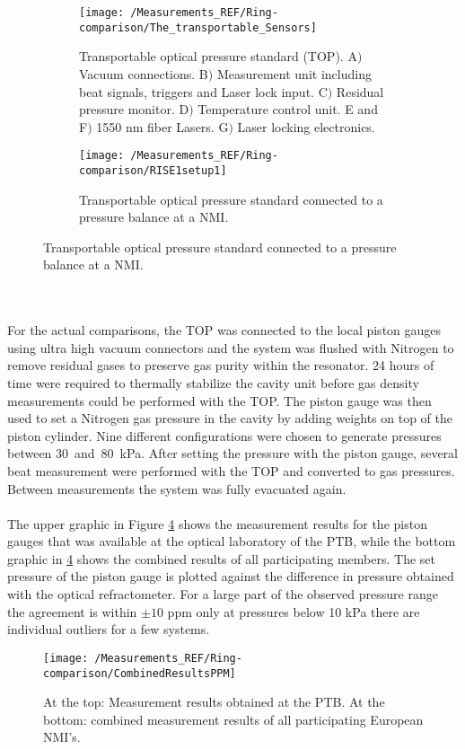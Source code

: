 \begin{figure}[h]
	\begin{subfigure}[t]{.49\textwidth}
		\centering
		\texttt{[image: /Measurements\_REF/Ring-comparison/The\_transportable\_Sensors]}
		\caption{Transportable optical pressure standard (TOP). A$)$ Vacuum connections. B$)$ Measurement unit including beat signals, triggers and Laser lock input. C$)$ Residual pressure monitor. D$)$ Temperature control unit. E and F$)$ 1550 nm fiber Lasers. G$)$ Laser locking electronics. }
		\label{fig:TOP}
	\end{subfigure}
	\hfill
	\begin{subfigure}[t]{.49\textwidth}
		\centering
		\texttt{[image: /Measurements\_REF/Ring-comparison/RISE1setup1]}
		\caption{Transportable optical pressure standard connected to a pressure balance at a NMI.}
		\label{fig:TOP_piston_gauge}
	\end{subfigure}
	\label{fig:ringcomparsion}
\end{figure}\\\\
\noindent
For the actual comparisons, the TOP was connected to the local piston gauges using  ultra high vacuum connectors and the system was flushed with Nitrogen to remove residual gases to preserve gas purity within the resonator. 24 hours of time were required to thermally stabilize the cavity unit before gas density measurements could be performed with the TOP. The piston gauge was then used to set a Nitrogen gas pressure in the cavity by adding weights on top of the piston cylinder. Nine different configurations were chosen to generate pressures between \mbox{30 and 80 kPa}. After setting the pressure with the piston gauge, several beat measurement were performed with the TOP and converted to gas pressures. Between measurements the system was fully evacuated again. \\\\
The upper graphic in Figure \ref{fig:TOP_all_results} shows the measurement results for the piston gauges that was available at the optical laboratory of the PTB, while the bottom graphic in \ref{fig:TOP_all_results} shows the combined results of all participating members. The set pressure of the piston gauge is plotted against the difference in pressure obtained with the optical refractometer. For a large part of the observed pressure range the agreement is within $\pm 10 $ ppm only at pressures below 10 kPa there are individual outliers for a few systems. 
\begin{figure}[h]
	\centering
	\texttt{[image: /Measurements\_REF/Ring-comparison/CombinedResultsPPM]}
	\caption{At the top: Measurement results obtained at the PTB. At the bottom: combined measurement results of all participating European NMI's.}
	\label{fig:TOP_all_results}
\end{figure}
